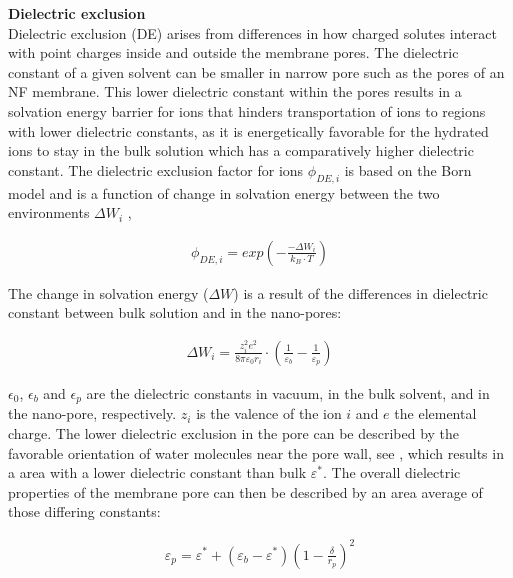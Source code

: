 \textbf{Dielectric exclusion}\\
Dielectric exclusion (DE) arises from differences in how charged solutes interact with point charges inside and outside the membrane pores.
The dielectric constant of a given solvent can be smaller in narrow pore such as the pores of an NF membrane. 
This lower dielectric constant within the pores results in a solvation energy barrier for ions that hinders transportation of ions to regions with lower dielectric constants, as it is energetically favorable for the hydrated ions to stay in the bulk solution which has a comparatively higher dielectric constant. 
The dielectric exclusion factor for ions $\phi_{DE,i}$ is based on the Born model and is a function of change in solvation energy between the two environments $\Delta  W_i$ , 

\begin{ceqn}
    \begin{align}
   \phi_{DE,i}=exp\left(-\frac{-\Delta W_i}{k_B \cdot T}\right)
    \end{align} 
 \end{ceqn}
The change in solvation energy ($\Delta W$) is a result of the differences in dielectric constant between bulk solution and in the nano-pores: 

\begin{ceqn}
    \begin{align}
   \Delta W_i = \frac{z_i^2e^2}{8\pi\varepsilon_0 r_i}\cdot \left(\frac{1}{\varepsilon_b}-\frac{1}{\varepsilon_p}\right)
    \end{align} 
 \end{ceqn}

$\epsilon_0$, $\epsilon_b$ and $\epsilon_p$ are the dielectric constants in vacuum, in the bulk solvent, and in the nano-pore, respectively.
$z_i$  is the valence of the ion $i$ and $e$ the elemental charge.
The lower dielectric exclusion in the pore can be described by the favorable orientation of water molecules near the pore wall, see , which results in a area with a lower dielectric constant than bulk $\varepsilon^*$.
The overall dielectric properties of the membrane pore can then be described by an area average of those differing constants:

\begin{ceqn}
    \begin{align}
        \varepsilon_p = \varepsilon^* +(\varepsilon_b - \varepsilon^*) \left(1-\frac{\delta}{r_p}\right)^2
    \end{align}
\end{ceqn}

